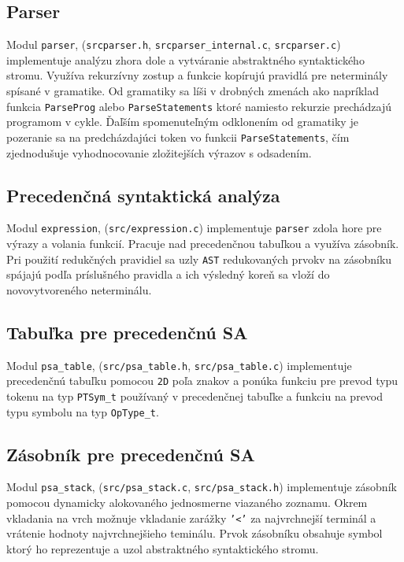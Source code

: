 \documentclass[11pt,a4paper]{article}
\newcommand*\id[1]{\texttt{#1}}
\begin{document}
  \subsection{Parser}
  Modul \texttt{parser}, (\texttt{src\/parser.h}, 
  \texttt{src\/parser\_internal.c}, \texttt{src\/parser.c}) implementuje
  analýzu zhora dole a vytváranie abstraktného syntaktického stromu. Využíva
  rekurzívny zostup a funkcie kopírujú pravidlá pre neterminály spísané v 
  gramatike. Od gramatiky sa líši v drobných zmenách ako napríklad funkcia
  \texttt{ParseProg} alebo \texttt{ParseStatements} ktoré namiesto rekurzie 
  prechádzajú programom v cykle. Ďaľším spomenuteľným odklonením od gramatiky je 
  pozeranie sa na predcházdajúci token vo funkcii \texttt{ParseStatements}, čím 
  zjednodušuje vyhodnocovanie zložitejších výrazov s odsadením.

  \subsection{Precedenčná syntaktická analýza}
  Modul \texttt{expression}, (\texttt{src/expression.c}) implementuje 
  \texttt{parser} zdola hore pre výrazy a volania funkcií. Pracuje nad 
  precedenčnou tabuľkou a využíva zásobník. Pri použití redukčných pravidiel sa 
  uzly \texttt{AST} redukovaných prvokv na zásobníku spájajú podľa príslušného 
  pravidla a ich výsledný koreň sa vloží do novovytvoreného neterminálu.

  \subsection{Tabuľka pre precedenčnú SA}
  Modul \texttt{psa\_table}, (\texttt{src/psa\_table.h}, \texttt{src/psa\_table.c})
  implementuje precedenčnú tabuľku pomocou \texttt{2D} poľa znakov a ponúka
  funkciu pre prevod typu tokenu na typ \texttt{PTSym\_t} používaný v precedenčnej
  tabuľke a funkciu na prevod typu symbolu na typ \texttt{OpType\_t}.

  \subsection{Zásobník pre precedenčnú SA}
  Modul \texttt{psa\_stack}, (\texttt{src/psa\_stack.c}, \texttt{src/psa\_stack.h})
  implementuje zásobník pomocou dynamicky alokovaného jednosmerne viazaného
  zoznamu. Okrem vkladania na vrch možnuje vkladanie zarážky \id{'<'} za 
  najvrchnejší terminál a vrátenie hodnoty najvrchnejšieho teminálu. Prvok
  zásobníku obsahuje symbol ktorý ho reprezentuje a uzol abstraktného
  syntaktického stromu.
\end{document}
